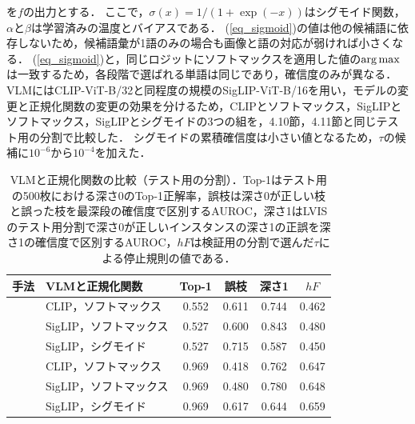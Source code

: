 \noindent
を$ f $の出力とする．
ここで，$ \sigma(x) = 1 / (1 + \exp(-x)) $はシグモイド関数，$ \alpha $と$ \beta $は学習済みの温度とバイアスである．
(\ref{eq_sigmoid})の値は他の候補語に依存しないため，候補語彙が1語のみの場合も画像と語の対応が弱ければ小さくなる．
(\ref{eq_sigmoid})と，同じロジットにソフトマックスを適用した値の$ \operatorname*{arg\,max} $は一致するため，各段階で選ばれる単語は同じであり，確信度のみが異なる．
VLMにはCLIP-ViT-B/32と同程度の規模のSigLIP-ViT-B/16を用い，モデルの変更と正規化関数の変更の効果を分けるため，CLIPとソフトマックス，SigLIPとソフトマックス，SigLIPとシグモイドの3つの組を，4.10節，4.11節と同じテスト用の分割で比較した．
シグモイドの累積確信度は小さい値となるため，$ \tau $の候補に$ 10^{-6} $から$ 10^{-4} $を加えた．

\begin{table}[t]
    \centering
    \caption{VLMと正規化関数の比較（テスト用の分割）．Top-1はテスト用の500枚における深さ0のTop-1正解率，誤枝は深さ0が正しい枝と誤った枝を最深段の確信度で区別するAUROC，深さ1はLVISのテスト用分割で深さ0が正しいインスタンスの深さ1の正誤を深さ1の確信度で区別するAUROC，$ hF $は検証用の分割で選んだ$ \tau $による停止規則の値である．}
    \label{tab_siglip}
    \footnotesize
    \setlength{\tabcolsep}{1.5pt}
    \begin{tabular}{llcccc}
        \toprule
        手法 & VLMと正規化関数 & Top-1 & 誤枝 & 深さ1 & $ hF $ \\
        \midrule
         & CLIP，ソフトマックス   & 0.552 & 0.611 & 0.744 & 0.462 \\
                                                                & SigLIP，ソフトマックス & 0.527 & 0.600 & 0.843 & 0.480 \\
                                                                & SigLIP，シグモイド     & 0.527 & 0.715 & 0.587 & 0.450 \\
        \midrule
         & CLIP，ソフトマックス   & 0.969 & 0.418 & 0.762 & 0.647 \\
                                                                & SigLIP，ソフトマックス & 0.969 & 0.480 & 0.780 & 0.648 \\
                                                                & SigLIP，シグモイド     & 0.969 & 0.617 & 0.644 & 0.659 \\
        \bottomrule
    \end{tabular}
\end{table}

